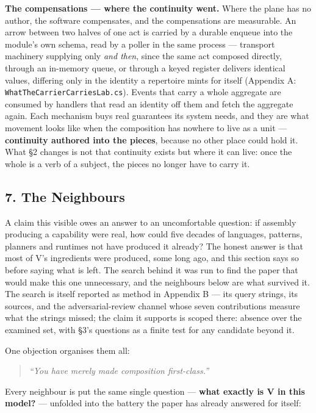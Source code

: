 \documentclass[
]{article}
\begin{document}
\textbf{The compensations --- where the continuity went.} Where the
plane has no author, the software compensates, and the compensations are
measurable. An arrow between two halves of one act is carried by a
durable enqueue into the module's own schema, read by a poller in the
same process --- transport machinery supplying only \emph{and then},
since the same act composed directly, through an in-memory queue, or
through a keyed register delivers identical values, differing only in
the identity a repertoire mints for itself (Appendix A:
\texttt{WhatTheCarrierCarriesLab.cs}). Events that carry a whole
aggregate are consumed by handlers that read an identity off them and
fetch the aggregate again. Each mechanism buys real guarantees its
system needs, and they are what movement looks like when the composition
has nowhere to live as a unit --- \textbf{continuity authored into the
pieces}, because no other place could hold it. What §2 changes is not
that continuity exists but where it can live: once the whole is a verb
of a subject, the pieces no longer have to carry it.

\subsection{7. The Neighbours}\label{the-neighbours}

A claim this visible owes an answer to an uncomfortable question: if
assembly producing a capability were real, how could five decades of
languages, patterns, planners and runtimes not have produced it already?
The honest answer is that most of V's ingredients were produced, some
long ago, and this section says so before saying what is left. The
search behind it was run to find the paper that would make this one
unnecessary, and the neighbours below are what survived it. The search
is itself reported as method in Appendix B --- its query strings, its
sources, and the adversarial-review channel whose seven contributions
measure what the strings missed; the claim it supports is scoped there:
absence over the examined set, with §3's questions as a finite test for
any candidate beyond it.

One objection organises them all:

\begin{quote}
\emph{``You have merely made composition first-class.''}
\end{quote}

Every neighbour is put the same single question --- \textbf{what exactly
is V in this model?} --- unfolded into the battery the paper has already
answered for itself:
\end{document}
